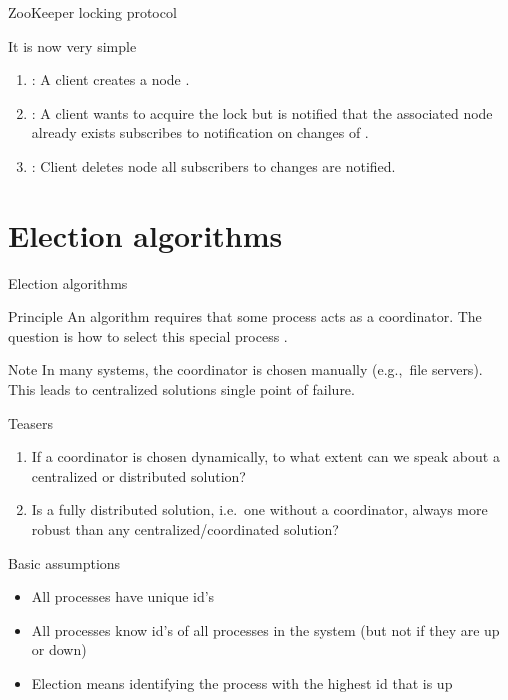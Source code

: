 \begin{frame}{ZooKeeper locking protocol}
  \begin{block}{It is now very simple}
    \begin{enumerate}\firmlist
      \item {}: A client  creates a node .
      \item {}: A client  wants to acquire the lock but is notified that the associated node
            already exists \mathexpr{\Rightarrow}  subscribes to notification on changes of .
      \item {}: Client  deletes node  \mathexpr{\Rightarrow} all subscribers to
            changes are notified.
    \end{enumerate}


  \end{block}
\end{frame}
\section{Election algorithms}
\begin{frame}{Election algorithms}
  \begin{block}{Principle}
    An algorithm requires that some process acts as a coordinator. The question is how to select this special
    process .
  \end{block}
  \begin{block}{Note}
    In many systems, the coordinator is chosen manually (e.g.,\ file servers). This leads to centralized
    solutions \mathexpr{\Rightarrow} single point of failure.
  \end{block}
  \begin{block}{Teasers}
    \begin{enumerate}
      \item If a coordinator is chosen dynamically, to what extent can we speak about a centralized or
            distributed solution?
      \item Is a fully distributed solution, i.e.\ one without a coordinator, always more robust than any
            centralized/coordinated solution?
    \end{enumerate}
  \end{block}
\end{frame}
\begin{frame}{Basic assumptions}
  \begin{block}{}
    \begin{itemize}
      \item All processes have unique id's
      \item All processes know id's of all processes in the system (but not if they are up or down)
      \item Election means identifying the process with the highest id that is up
    \end{itemize}
  \end{block}
\end{frame}

